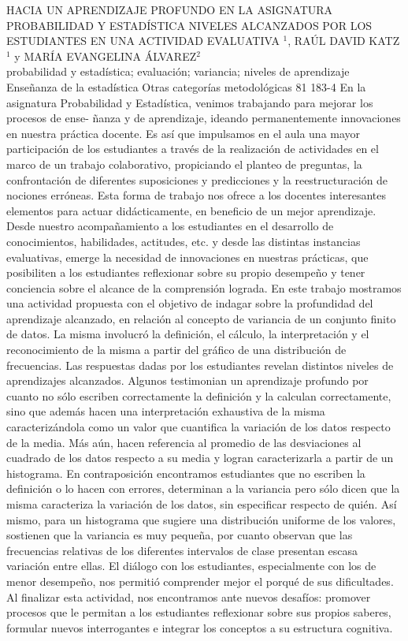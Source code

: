 \A
{HACIA UN APRENDIZAJE PROFUNDO EN LA ASIGNATURA PROBABILIDAD Y ESTADÍSTICA NIVELES ALCANZADOS POR LOS ESTUDIANTES EN UNA ACTIVIDAD EVALUATIVA}
{$^1$, RAÚL DAVID KATZ$^1$ y MARÍA EVANGELINA ÁLVAREZ$^2$}
{
\\}
{probabilidad y estadística; evaluación; variancia; niveles de aprendizaje} 
 {Enseñanza de la estadística} 
 {Otras categorías metodológicas} 
 {81} 
 {183-4}
{En la asignatura Probabilidad y Estadística, venimos trabajando para mejorar los procesos de ense- ñanza y de aprendizaje, ideando permanentemente innovaciones en nuestra práctica docente. Es así que impulsamos en el aula una mayor participación de los estudiantes a través de la realización de actividades en el marco de un trabajo colaborativo, propiciando el planteo de preguntas, la confrontación de diferentes suposiciones y predicciones y la reestructuración de nociones erróneas. Esta forma de trabajo nos ofrece a los docentes interesantes elementos para actuar didácticamente, en beneficio de un mejor aprendizaje. Desde nuestro acompañamiento a los estudiantes en el desarrollo de conocimientos, habilidades, actitudes, etc. y desde las distintas instancias evaluativas, emerge la necesidad de innovaciones en nuestras prácticas, que posibiliten a los estudiantes reflexionar sobre su propio desempeño y tener conciencia sobre el alcance de la comprensión lograda. En este trabajo mostramos una actividad propuesta con el objetivo de indagar sobre la profundidad del aprendizaje alcanzado, en relación al concepto de variancia de un conjunto finito de datos. La misma involucró la definición, el cálculo, la interpretación y el reconocimiento de la misma a partir del gráfico de una distribución de frecuencias. Las respuestas dadas por los estudiantes revelan distintos niveles de aprendizajes alcanzados. Algunos testimonian un aprendizaje profundo por cuanto no sólo escriben correctamente la definición y la calculan correctamente, sino que además hacen una interpretación exhaustiva de la misma caracterizándola como un valor que cuantifica la variación de los datos respecto de la media. Más aún, hacen referencia al promedio de las desviaciones al cuadrado de los datos respecto a su media y logran caracterizarla a partir de un histograma. En contraposición encontramos estudiantes que no escriben la definición o lo hacen con errores, determinan a la variancia pero sólo dicen que la misma caracteriza la variación de los datos, sin especificar respecto de quién. Así mismo, para un histograma que sugiere una distribución uniforme de los valores, sostienen que la variancia es muy pequeña, por cuanto observan que las frecuencias relativas de los diferentes intervalos de clase presentan escasa variación entre ellas. El diálogo con los estudiantes, especialmente con los de menor desempeño, nos permitió comprender mejor el porqué de sus dificultades. Al finalizar esta actividad, nos encontramos ante nuevos desafíos: promover procesos que le permitan a los estudiantes reflexionar sobre sus propios saberes, formular nuevos interrogantes e integrar los conceptos a su estructura cognitiva. }
